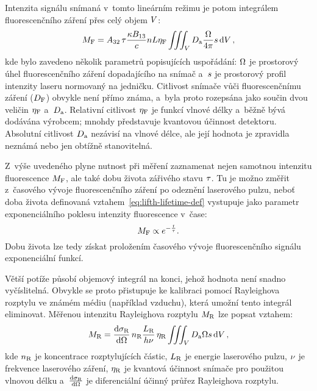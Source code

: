 Intenzita signálu snímaná v~tomto lineárním režimu je potom
integrálem fluorescenčního záření přes celý objem $V$:
\begin{equation}
	\label{eq:lifth-lifsignal}
	M_\text{F} = A_{32}\,\tau
	\frac{\kappa B_{13}}{c}
	n L \eta_\text{F}
	\iiint_V D_\text{a} \frac{\Omega}{4\pi} s \dd{V},
\end{equation}
kde bylo zavedeno několik parametrů popisujících uspořádání:
$\Omega$ je prostorový úhel fluorescenčního záření dopadajícího
na snímač
a~$s$ je prostorový profil intenzity laseru normovaný na jedničku.
Citlivost snímače vůči fluorescenčnímu záření ($D_\text{F}$) obvykle není přímo
známa,
a~byla proto rozepsána jako součin dvou veličin $\eta_\text{F}$ a~$D_\text{a}$.
Relativní citlivost $\eta_\text{F}$ je funkcí vlnové délky a~běžně bývá dodávána
výrobcem; mnohdy představuje kvantovou účinnost detektoru.
Absolutní citlivost $D_\text{a}$ nezávisí na vlnové délce,
ale její hodnota je zpravidla neznámá nebo jen obtížně stanovitelná.

Z~výše uvedeného plyne nutnost při měření zaznamenat nejen samotnou
intenzitu fluorescence $M_\text{F}$,
ale také dobu života zářivého stavu $\tau$.
Tu je možno změřit z~časového vývoje fluorescenčního záření po odeznění
laserového pulzu,
neboť doba života definovaná vztahem~\eqref{eq:lifth-lifetime-def} vystupuje
jako parametr exponenciálního poklesu intenzity fluorescence v~čase:
\begin{equation}
	M_\text{F} \propto e^{-\frac{t}{\tau}}.
\end{equation}
Dobu života lze tedy získat proložením časového vývoje fluorescenčního
signálu exponenciální funkcí.

Větší potíže působí objemový integrál na konci, jehož hodnota není snadno
vyčíslitelná.
Obvykle se proto přistupuje ke kalibraci pomocí Ray\-leigh\-ova rozptylu
ve známém médiu (například vzduchu),
která umožní tento integrál eliminovat.
Měřenou intenzitu Rayleighova rozptylu $M_\text{R}$ lze popsat vztahem:%
\autocite{lif-oh}
\begin{equation}
	\label{eq:lifth-rayleighsignal}
	M_\text{R} = \dv{\sigma_\text{R}}{\Omega} \, n_\text{R}
	\frac{L_\text{R}}{h\nu} \, \eta_\text{R}
	\iiint_V D_\text{a} \Omega s \dd{V},
\end{equation}
kde $n_\text{R}$ je koncentrace rozptylujících částic,
$L_\text{R}$ je energie laserového pulzu,
$\nu$ je frekvence laserového záření,
$\eta_\text{R}$ je kvantová účinnost snímače pro použitou vlnovou délku
a~$\dv{\sigma_\text{R}}{\Omega}$ je diferenciální účinný průřez Rayleighova rozptylu.


